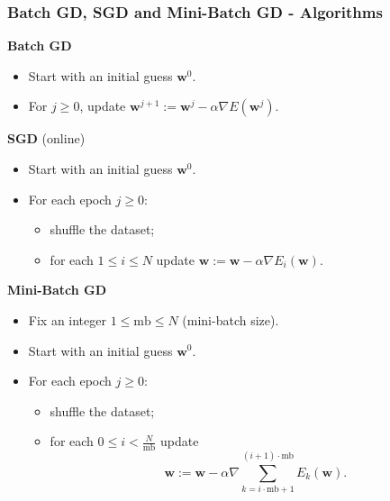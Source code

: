 \documentclass{beamer}
\begin{document}
	\begin{frame}
		\frametitle{Batch GD, SGD and Mini-Batch GD - Algorithms}
		
		
		\textbf{Batch GD}
		\begin{itemize}
			\item Start with an initial guess $\bm{w}^0$.
			\item For $j \geq 0$, update $\bm{w}^{j+1} := \bm{w}^{j} - \alpha \nabla E(\bm{w}^j)$.
		\end{itemize}
		
		\textbf{SGD} (online)
		\begin{itemize}
			\item Start with an initial guess $\bm{w}^0$.
			\item For each epoch $j \geq 0$:
			\begin{itemize}
				\item shuffle the dataset;
				\item for each $1\leq i \leq N$ update $\bm{w} := \bm{w} - \alpha \nabla E_i(\bm{w})$.
			\end{itemize}
		\end{itemize}
	
		\textbf{Mini-Batch GD}
		\begin{itemize}
			\item Fix an integer $1 \leq \text{mb} \leq N$ (mini-batch size).
			\item Start with an initial guess $\bm{w}^0$.
			\item For each epoch $j \geq 0$:
			\begin{itemize}
				\item shuffle the dataset;
				\item for each $0 \leq i < \frac{N}{\text{mb}}$ update
				\begin{equation*}
					\bm{w} := \bm{w} - \alpha \nabla \sum_{k=i\cdot\text{mb} + 1}^{(i+1)\cdot\text{mb}}E_k(\bm{w}).
				\end{equation*}
			\end{itemize} 
		\end{itemize}
		
	\end{frame}
\end{document}
